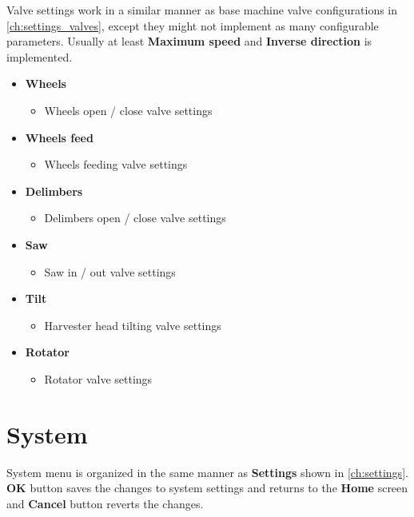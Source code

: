 \documentclass[12pt,a4paper,english]{uvmanual}
\begin{document}
Valve settings work in a similar manner as base machine valve configurations in \autoref{ch:settings_valves}, except they might not implement as many configurable parameters. Usually at least \textbf{Maximum speed} and \textbf{Inverse direction} is implemented.


\begin{itemize}
 \item \textbf{Wheels}
 \begin{itemize}
  \item Wheels open / close valve settings
 \end{itemize}

 \item \textbf{Wheels feed}
 \begin{itemize}
  \item Wheels feeding valve settings
 \end{itemize}

 \item \textbf{Delimbers}
 \begin{itemize}
  \item Delimbers open / close valve settings
 \end{itemize}

 \item \textbf{Saw}
 \begin{itemize}
  \item Saw in / out valve settings
 \end{itemize}

 \item \textbf{Tilt}
 \begin{itemize}
  \item Harvester head tilting valve settings
 \end{itemize}
 
\item \textbf{Rotator}
\begin{itemize}
 \item Rotator valve settings
\end{itemize}

\end{itemize}


\chapter{System}\label{ch:system}

System menu is organized in the same manner as \textbf{Settings} shown in \autoref{ch:settings}. \textbf{OK} button saves the changes to system settings and returns to the \textbf{Home} screen and \textbf{Cancel} button reverts the changes.
\end{document}

